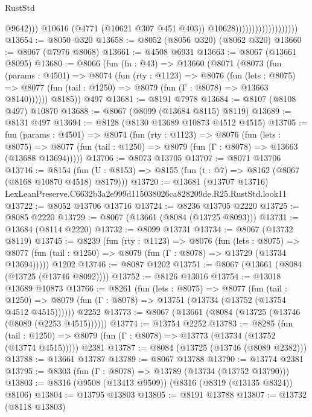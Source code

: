 \begin{lexlean}{RustStd}
\begin{coremodule}
                                                @9642)))
                                          @10616
                                          (@4771 (@10621 @307 @451 @403))
                                          @10628)))))))))))))))))))
@13654 := @8050 @320
@13658 := @8052 (@8056 @320) (@8062 @320)
@13660 := @8067 (@7976 @8068)
@13661 := @4508 @6931
@13663 := @8067 (@13661 @8095)
@13680 := @8066
    (fun (fn : @43) =>
    @13660
      (@8071
        (@8073
          (fun (params : @4501) =>
          @8074
            (fun (rty : @1123) =>
            @8076
              (fun (lets : @8075) =>
              @8077 (fun (tail : @1250) => @8079 (fun (Γ : @8078) => @13663 @8140))))))
        @8185))
    @497
@13681 := @8191 @7978
@13684 := @8107 (@8108 @497) @10870
@13688 := @8067 (@8099 (@13684 @8115) @8119)
@13689 := @8131 @497
@13694 := @8128 (@8130 @13689 @10873 @4512 @4515)
@13705 := fun (params : @4501) =>
  @8074
    (fun (rty : @1123) =>
    @8076
      (fun (lets : @8075) =>
      @8077 (fun (tail : @1250) => @8079 (fun (Γ : @8078) => @13663 (@13688 @13694)))))
@13706 := @8073 @13705
@13707 := @8071 @13706
@13716 := @8154
    (fun (U : @8153) => @8155 (fun (t : @7) => @8162 (@8067 (@8168 @10870 @4518) @8179)))
@13720 := @13681
    (@13707 @13716)
    LexLeanPreserve.C6632b3a2e999d115038026ca828209de.R25.RustStd.look11
@13722 := @8052 @13706 @13716
@13724 := @8236 @13705 @2220
@13725 := @8085 @2220
@13729 := @8067 (@13661 (@8084 (@13725 @8093)))
@13731 := @13684 (@8114 @2220)
@13732 := @8099 @13731
@13734 := @8067 (@13732 @8119)
@13745 := @8239
    (fun (rty : @1123) =>
    @8076
      (fun (lets : @8075) =>
      @8077 (fun (tail : @1250) => @8079 (fun (Γ : @8078) => @13729 (@13734 @13694)))))
    @1202
@13746 := @8087 @1202
@13751 := @8067 (@13661 (@8084 (@13725 (@13746 @8092))))
@13752 := @8126 @13016
@13754 := @13018 @13689 @10873
@13766 := @8261
    (fun (lets : @8075) =>
    @8077
      (fun (tail : @1250) =>
      @8079 (fun (Γ : @8078) => @13751 (@13734 (@13752 (@13754 @4512 @4515))))))
    @2252
@13773 := @8067 (@13661 (@8084 (@13725 (@13746 (@8089 (@2253 @4515))))))
@13774 := @13754 @2252
@13783 := @8285
    (fun (tail : @1250) => @8079 (fun (Γ : @8078) => @13773 (@13734 (@13752 (@13774 @4515)))))
    @2381
@13787 := @8084 (@13725 (@13746 (@8089 @2382)))
@13788 := @13661 @13787
@13789 := @8067 @13788
@13790 := @13774 @2381
@13795 := @8303 (fun (Γ : @8078) => @13789 (@13734 (@13752 @13790)))
@13803 := @8316 (@9508 (@13413 @9509)) (@8316 (@8319 (@13135 @8324)) @8106)
@13804 := @13795 @13803
@13805 := @8191 @13788
@13807 := @13732 (@8118 @13803)

\end{coremodule}
\end{lexlean}
